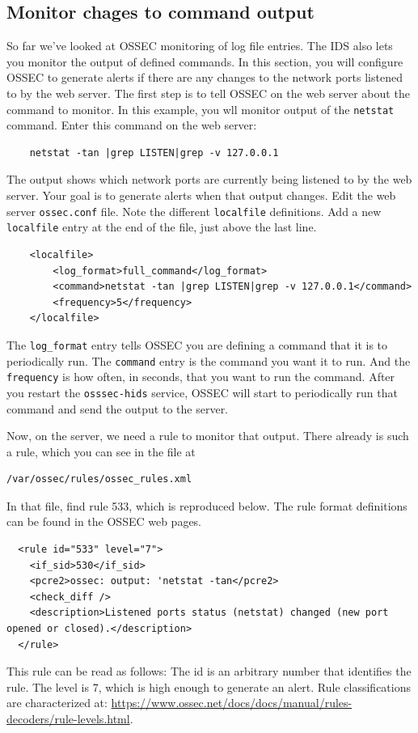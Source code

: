 \subsection{Monitor chages to command output}
So far we've looked at OSSEC monitoring of log file entries.  The IDS also lets you monitor the output of defined commands.
In this section, you will configure OSSEC to generate alerts if there are any changes to the network ports listened to by 
the web server.  The first step is to tell OSSEC on the web server about the command to monitor.  In this example, you wll 
monitor output of the {\tt netstat} command.  Enter this command on the web server:
\begin{verbatim}
    netstat -tan |grep LISTEN|grep -v 127.0.0.1
\end{verbatim}
\noindent The output shows which network ports are currently being listened to by the web server.  Your goal is to generate 
alerts when that output changes.  Edit the web server {\tt ossec.conf} file.  Note the different {\tt localfile} definitions.
Add a new {\tt localfile} entry at the end of the file, just above the last line.
\begin{verbatim}
    <localfile>
        <log_format>full_command</log_format>
        <command>netstat -tan |grep LISTEN|grep -v 127.0.0.1</command>
        <frequency>5</frequency>
    </localfile>
\end{verbatim}
\noindent  The {\tt log\_format} entry tells OSSEC you are defining a command that it is to periodically run.
The {\tt command} entry is the command you want it to run.  And the {\tt frequency} is how often, in seconds, that
you want to run the command.  After you restart the {\tt osssec-hids} service, OSSEC will start to periodically run
that command and send the output to the server.

Now, on the server, we need a rule to monitor that output.  There already is such a rule, which you can see in the
file at
\begin{verbatim}
/var/ossec/rules/ossec_rules.xml
\end{verbatim}

\noindent In that file, find rule 533, which is reproduced below.  
The rule format definitions can be found in the OSSEC web pages.  
\begin{verbatim}
  <rule id="533" level="7">
    <if_sid>530</if_sid>
    <pcre2>ossec: output: 'netstat -tan</pcre2>
    <check_diff />
    <description>Listened ports status (netstat) changed (new port opened or closed).</description>
  </rule>

\end{verbatim}
\noindent This rule can be read as follows:  The id is an arbitrary number that identifies the rule.
The level is 7, which is high enough to generate an alert.  Rule classifications
are characterized at: \url{https://www.ossec.net/docs/docs/manual/rules-decoders/rule-levels.html}.

